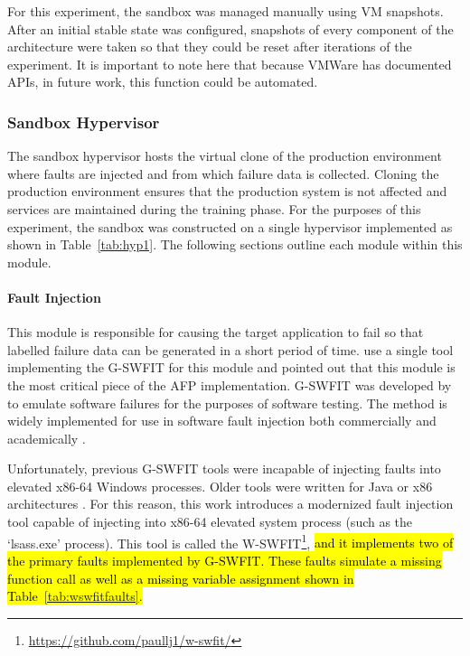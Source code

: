 For this experiment, the sandbox was managed manually using \ac{VM} snapshots.
After an initial stable state was configured, snapshots of every component of
the architecture were taken so that they could be reset after iterations of the
experiment.  It is important to note here that because VMWare has documented
\ac{API}s, in future work, this function could be automated.

\subsubsection{Sandbox Hypervisor} \label{sec:sandbox}
The sandbox hypervisor hosts the virtual clone of the production environment
where faults are injected and from which failure data is collected.  Cloning
the production environment ensures that the production system is not affected
and services are maintained during the training phase.  For the purposes of
this experiment, the sandbox was constructed on a single hypervisor implemented
as shown in Table~\ref{tab:hyp1}.  The following sections outline each module
within this module.

\paragraph{Fault Injection} \label{sec:faultInjectionTool} 
This module is responsible for causing the target application to fail so that
labelled failure data can be generated in a short period of time.
\citet{irrera2015} use a single tool implementing the \ac{G-SWFIT} for this
module and pointed out that this module is the most critical piece of the
\ac{AFP} implementation.  \ac{G-SWFIT} was developed by \citet{gswfit} to
emulate software failures for the purposes of software testing.  The method is
widely implemented for use in software fault injection both commercially and
academically \citep{cotroneo2012,irrera2014,natella2010,umadevi2015}. 

Unfortunately, previous \ac{G-SWFIT} tools were incapable of injecting faults
into elevated x86-64 Windows processes.  Older tools were written for Java or
x86 architectures \citep{gswfit,martins2002jaca,natella2010,sanches2011jswfit}.
For this reason, this work introduces a modernized fault injection tool capable
of injecting into x86-64 elevated system process (such as the `lsass.exe'
process).  This tool is called the
\ac{W-SWFIT}\footnote{\url{https://github.com/paullj1/w-swfit/}}, \hl{and it 
implements two of the primary faults implemented by \ac{G-SWFIT}.  These faults
simulate a missing function call as well as a missing variable assignment shown
in Table~\ref{tab:wswfitfaults}.}

